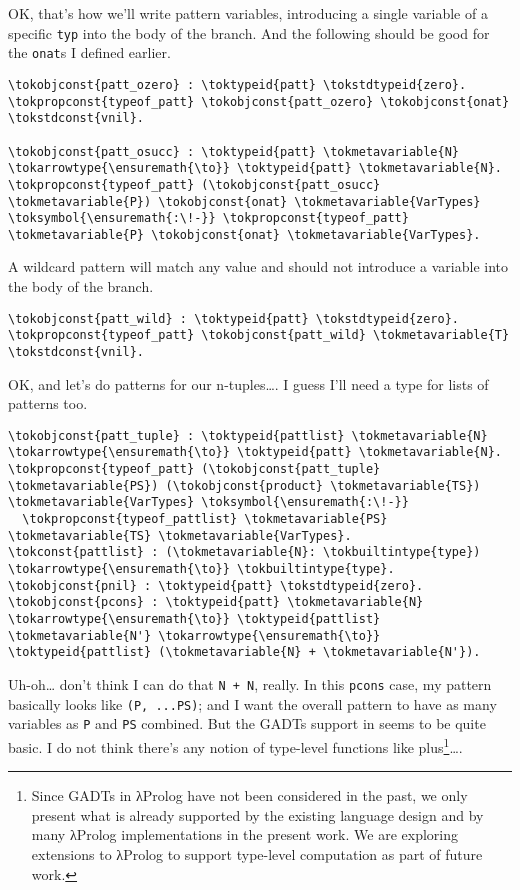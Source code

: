 OK, that's how we'll write pattern variables, introducing a single
variable of a specific \texttt{typ} into the body of the branch. And the
following should be good for the \texttt{onat}s I defined earlier.

\begin{verbatim}
\tokobjconst{patt_ozero} : \toktypeid{patt} \tokstdtypeid{zero}.
\tokpropconst{typeof_patt} \tokobjconst{patt_ozero} \tokobjconst{onat} \tokstdconst{vnil}.

\tokobjconst{patt_osucc} : \toktypeid{patt} \tokmetavariable{N} \tokarrowtype{\ensuremath{\to}} \toktypeid{patt} \tokmetavariable{N}.
\tokpropconst{typeof_patt} (\tokobjconst{patt_osucc} \tokmetavariable{P}) \tokobjconst{onat} \tokmetavariable{VarTypes} \toksymbol{\ensuremath{:\!-}} \tokpropconst{typeof_patt} \tokmetavariable{P} \tokobjconst{onat} \tokmetavariable{VarTypes}.
\end{verbatim}

A wildcard pattern will match any value and should not introduce a
variable into the body of the branch.

\begin{verbatim}
\tokobjconst{patt_wild} : \toktypeid{patt} \tokstdtypeid{zero}.
\tokpropconst{typeof_patt} \tokobjconst{patt_wild} \tokmetavariable{T} \tokstdconst{vnil}.
\end{verbatim}

OK, and let's do patterns for our n-tuples\ldots{}. I guess I'll need a
type for lists of patterns too.

\begin{verbatim}
\tokobjconst{patt_tuple} : \toktypeid{pattlist} \tokmetavariable{N} \tokarrowtype{\ensuremath{\to}} \toktypeid{patt} \tokmetavariable{N}.
\tokpropconst{typeof_patt} (\tokobjconst{patt_tuple} \tokmetavariable{PS}) (\tokobjconst{product} \tokmetavariable{TS}) \tokmetavariable{VarTypes} \toksymbol{\ensuremath{:\!-}}
  \tokpropconst{typeof_pattlist} \tokmetavariable{PS} \tokmetavariable{TS} \tokmetavariable{VarTypes}.
\tokconst{pattlist} : (\tokmetavariable{N}: \tokbuiltintype{type}) \tokarrowtype{\ensuremath{\to}} \tokbuiltintype{type}.
\tokobjconst{pnil} : \toktypeid{patt} \tokstdtypeid{zero}.
\tokobjconst{pcons} : \toktypeid{patt} \tokmetavariable{N} \tokarrowtype{\ensuremath{\to}} \toktypeid{pattlist} \tokmetavariable{N'} \tokarrowtype{\ensuremath{\to}} \toktypeid{pattlist} (\tokmetavariable{N} + \tokmetavariable{N'}).
\end{verbatim}

Uh-oh\ldots{} don't think I can do that
\texttt{N\ +\ N\textquotesingle{}}, really. In this \texttt{pcons} case,
my pattern basically looks like \texttt{(P,\ ...PS)}; and I want the
overall pattern to have as many variables as \texttt{P} and \texttt{PS}
combined. But the GADTs support in \lamprolog seems to be quite basic. I
do not think there's any notion of type-level functions like
plus\footnote{Since GADTs in \foreignlanguage{greek}{λ}Prolog have not been considered in the past, we only present what is already supported by the existing language design and by many \foreignlanguage{greek}{λ}Prolog implementations in the present work. We are exploring extensions to \foreignlanguage{greek}{λ}Prolog to support type-level computation as part of future work.}\ldots{}.

